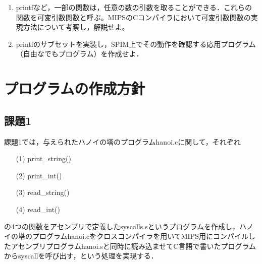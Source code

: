 \documentclass[a4j]{jarticle}
\begin{document}
\begin{enumerate}
{\baselineskip 3mm
\begin{verbatim}
int primes_stat[10];
 
char * string_ptr = "ABCDEFG";
char string_ary[] = "ABCDEFG";
 
void print_var(char *name, int val)
{
  print_string(name);
  print_string(" = ");
  print_int(val);
  print_string("\n");
}
 
main()
{
  int primes_auto[10];
 
  primes_stat[0] = 2;
  primes_auto[0] = 3;
 
  print_var("primes_stat[0]", primes_stat[0]);
  print_var("primes_auto[0]", primes_auto[0]);
}
 
\end{verbatim}
}


\item printfなど，一部の関数は，任意の数の引数を取ることができる．これらの関数を可変引数関数と呼ぶ。MIPSのCコンパイラにおいて可変引数関数の実現方法について考察し，解説せよ。

\item printfのサブセットを実装し，SPIM上でその動作を確認する応用プログラム（自由なでもプログラム）を作成せよ．

\end{enumerate}


%
%

\section{プログラムの作成方針}


\subsection{課題1}

課題1では，与えられたハノイの塔のプログラムhanoi.cに関して，それぞれ

\begin{itemize}
  \item[(1)]print\_string()
  \item[(2)]print\_int()
  \item[(3)]read\_string()
  \item[(4)]read\_int()
\end{itemize}

の4つの関数をアセンブリで定義したsyscalls.sというプログラムを作成し，ハノイの塔のプログラムhanoi.cをクロスコンパイラを用いてMIPS用にコンパイルしたアセンブリプログラムhanoi.sと同時に読み込ませてC言語で書いたプログラムからsyscallを呼び出す，という処理を実現する．
\end{document}
